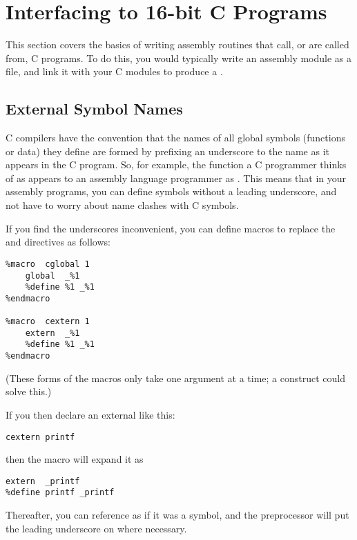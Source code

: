 \section{Interfacing to 16-bit C Programs}
\label{sec:16c}

This section covers the basics of writing assembly routines that
call, or are called from, C programs. To do this, you would
typically write an assembly module as a  file, and link it
with your C modules to produce a .

\subsection{External Symbol Names}
\label{subsec:16cunder}

C compilers have the
convention that the names of all global symbols (functions or data)
they define are formed by prefixing an underscore to the name as it
appears in the C program. So, for example, the function a C
programmer thinks of as  appears to an assembly language
programmer as . This means that in your assembly
programs, you can define symbols without a leading underscore, and
not have to worry about name clashes with C symbols.

If you find the underscores inconvenient, you can define macros to
replace the  and  directives as follows:

\begin{lstlisting}
%macro  cglobal 1
    global  _%1
    %define %1 _%1
%endmacro

%macro  cextern 1
    extern  _%1
    %define %1 _%1
%endmacro
\end{lstlisting}

(These forms of the macros only take one argument at a time; a
 construct could solve this.)

If you then declare an external like this:

\begin{lstlisting}
cextern printf
\end{lstlisting}

then the macro will expand it as

\begin{lstlisting}
extern  _printf
%define printf _printf
\end{lstlisting}

Thereafter, you can reference  as if it was a symbol, and
the preprocessor will put the leading underscore on where necessary.

